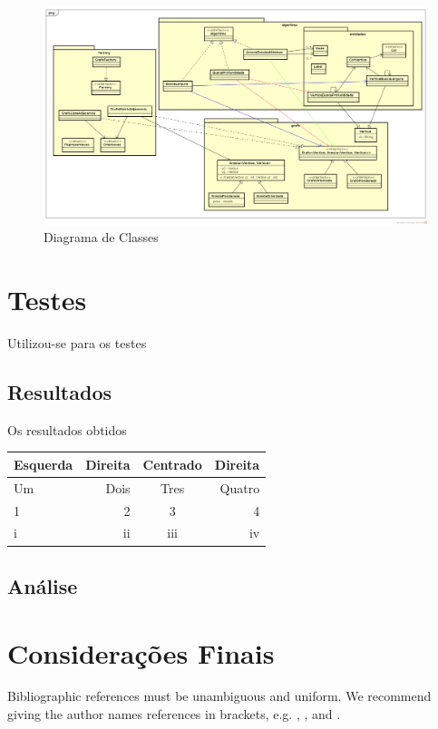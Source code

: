 \documentclass[12pt]{article}
\begin{document}
		\begin{landscape}
		\centering
		\begin{figure}[p]
		\includegraphics[width=1.4\textwidth]{ClassDiagram.png}
		\caption{Diagrama de Classes}
		\label{fig:classDiagram}
		\end{figure}
		\end{landscape}
		\restoregeometry

\section{Testes}\label{sec:testes}
	
	Utilizou-se para os testes 

	\subsection{Resultados}\label{sec:resultados}
		
		Os resultados obtidos 

		\begin{tabular}{l|r|c|r} \hline
			Esquerda & Direita & Centrado & Direita \\ \hline
			Um & Dois & Tres & Quatro \\
			1 & 2 & 3 & 4 \\
			i & ii & iii & iv \\ \hline
		\end{tabular}
		
	\subsection{Análise}\label{sec:analise}

\section{Considerações Finais}\label{sec:conclusao}

	Bibliographic references must be unambiguous and uniform.  We recommend giving the author names references in brackets, e.g. \cite{knuth:84}, \cite{boulic:91}, and \cite{smith:99}.




\end{document}
